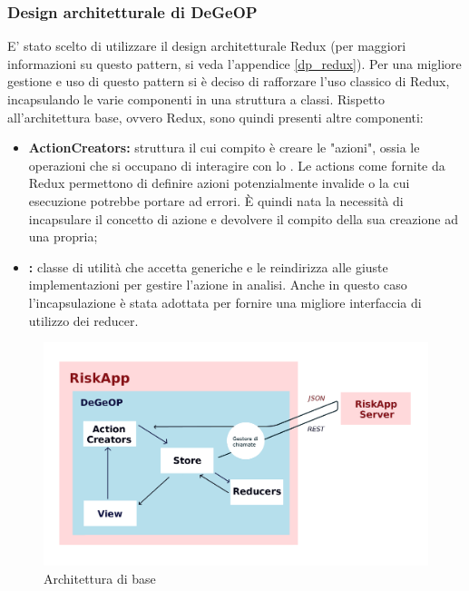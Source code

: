 \subsubsection{Design architetturale di DeGeOP}
E' stato scelto di utilizzare il design architetturale Redux (per maggiori informazioni su questo pattern, si veda l'appendice \ref{dp_redux}).
Per una migliore gestione e uso di questo pattern si è deciso di rafforzare l'uso classico di Redux, incapsulando le varie componenti in una struttura a classi.
Rispetto all'architettura base, ovvero Redux, sono quindi presenti altre componenti:
\begin{itemize}
	\item \textbf{ActionCreators:} struttura il cui compito è creare le "azioni", ossia le operazioni che si occupano di interagire con lo . Le actions come fornite da Redux permettono di definire azioni potenzialmente invalide o la cui esecuzione potrebbe portare ad errori. È quindi nata la necessità di incapsulare il concetto di azione e devolvere il compito della sua creazione ad una  propria;
	\item \textbf{:} classe di utilità che accetta  generiche e le reindirizza alle giuste implementazioni per gestire l'azione in analisi. Anche in questo caso l'incapsulazione è stata adottata per fornire una migliore interfaccia di utilizzo dei reducer.
\end{itemize}

\begin{figure}[H]
	\label{diagramma_architettura}
	\centering
	\includegraphics[width=\textwidth]{img/ArchitetturaBase.png}
	\caption{Architettura di base}
\end{figure}


